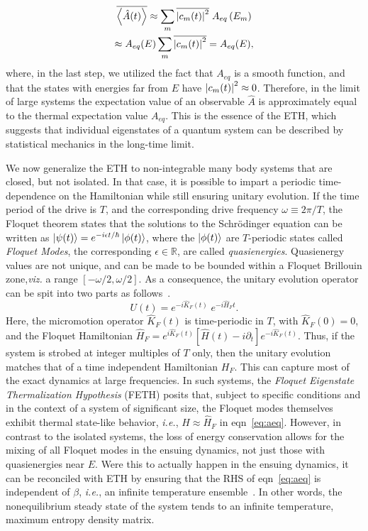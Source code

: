 \documentclass[%
reprint,
superscriptaddress,
linenumbers,
amsmath,amssymb,
aps,
prb,
showkeys,
]{revtex4-2}
\begin{document}
\begin{multline*}
\overline{\expval{\hat{A}(t)}} \approx \sum_m \overline{\abs{c_m(t)}^2}\; {A}_{eq}\left(E_m\right)\\
 \approx {A}_{eq}(E)\sum_m \overline{\abs{c_m(t)}^2} = A_{eq}(E),
\end{multline*}
where, in the last step, we utilized the fact that $A_{eq}$ is a smooth function, and that the states with energies far from $E$ have $\abs{c_m(t)}^2\approx 0$. Therefore, in the limit of large systems the expectation value of an observable $\hat{A}$ is approximately equal to the thermal expectation value $A_{eq}$. This is the essence of the ETH, which suggests that individual eigenstates of a quantum system can be described by statistical mechanics in the long-time limit.

We now generalize the ETH to non-integrable many body systems that are closed, but not isolated. In that case, it is possible to impart a periodic time-dependence on the Hamiltonian while still ensuring unitary evolution. If the time period of the drive is $T$, and the corresponding drive frequency $\omega\equiv 2\pi/T$, the Floquet theorem states that the solutions to the Schrödinger equation can be written as $\ket{\psi(t)} = e^{-i\epsilon t/\hbar} \ket{\phi(t)}$, where the $\ket{\phi(t)}$ are $T$-periodic states called \textit{Floquet Modes}, the corresponding $\epsilon\in \mathbb{R}$, are called \textit{quasienergies}. Quasienergy values are not unique, and can be made to be bounded within a Floquet {Brillouin zone},\textit{viz.} a range $[-\omega/2, \omega/2]$\cite{holthaus_floquet_2016,vogl_effective_2020}. As a consequence, the unitary evolution operator can be spit into two parts as follows~\cite{Bukov2014}.
\begin{equation}
	\label{eq:propagator}
	U(t) = e^{-i\hat{K}_F(t)}\;e^{-i\hat{H}_Ft}.
\end{equation}
Here, the micromotion operator $\hat{K}_F(t)$ is time-periodic in $T$, with $\hat{K}_F(0)=0$, and the Floquet Hamiltonian  {$\hat{H}_F = e^{i\hat{K}_F(t)} \left[\hat{H}(t)-i\partial_t\right] e^{-i \hat{K}_F(t)}$}. Thus, if the system is strobed at integer multiples of $T$ only, then the unitary evolution matches that of a time independent Hamiltonian $H_F$. This can capture most of the exact dynamics at large frequencies. In such systems, the \textit{Floquet Eigenstate Thermalization Hypothesis} (FETH) posits that, subject to specific conditions and in the context of a system of significant size, the Floquet modes themselves exhibit thermal state-like behavior, \textit{i.e.}, $\hat{H}\approx \hat{H}_F$ in eqn~\ref{eq:aeq}. However, in contrast to the isolated systems, the loss of energy conservation allows for the mixing of all Floquet modes in the ensuing dynamics, not just those with quasienergies near $E$. Were this to actually happen in the ensuing dynamics,  {it can be reconciled with ETH by ensuring that the RHS of eqn}~\ref{eq:aeq} {is independent of} $\beta$, \textit{i.e.}{, an infinite temperature ensemble}~\cite{alessio}. In other words, the nonequilibrium steady state of the system tends to an infinite temperature, maximum entropy density matrix.
\end{document}
